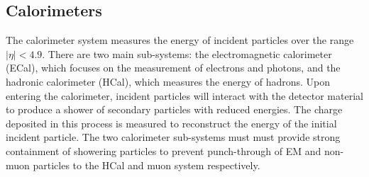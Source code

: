 



\subsection{Calorimeters}\label{sec:calorimeter}

The calorimeter system measures the energy of incident particles over the range $|\eta| < 4.9$.
There are two main sub-systems: the electromagnetic calorimeter (ECal), which focuses on the measurement of electrons and photons, and the hadronic calorimeter (HCal), which measures the energy of hadrons.
Upon entering the calorimeter, incident particles will interact with the detector material to produce a shower of secondary particles with reduced energies. 
The charge deposited in this process is measured to reconstruct the energy of the initial incident particle.
The two calorimeter sub-systems must must provide strong containment of showering particles to prevent punch-through of EM and non-muon particles to the HCal and muon system respectively.

